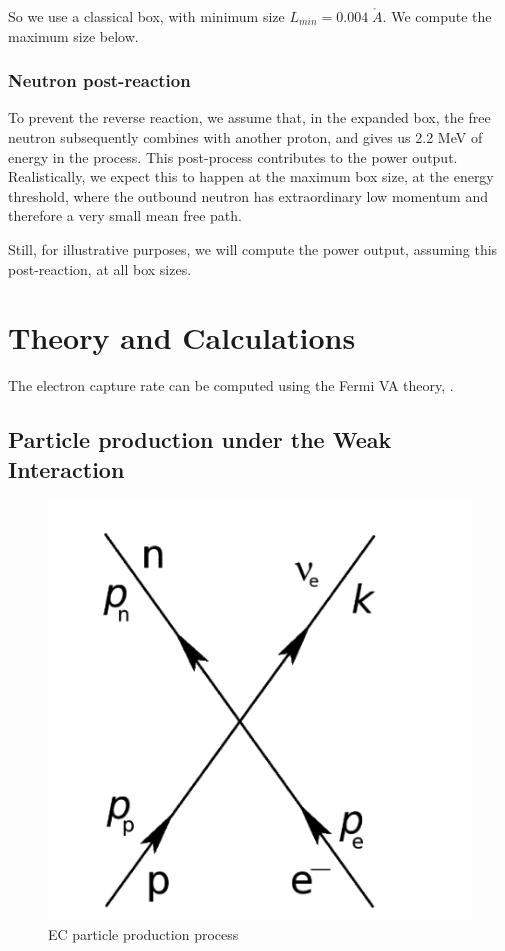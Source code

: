 \documentclass[%
 aip,
 jmp,%
 amsmath,amssymb,
 reprint,%
]{revtex4-1}
\begin{document}
So we use a classical box, with minimum size $L_{min}=0.004\;\mathring{A}$.  We compute the maximum size below.

\subsubsection{Neutron post-reaction}

To prevent the reverse reaction, we assume that, in the expanded box, the free neutron subsequently combines with another proton, and gives us 2.2 MeV of energy in the process.  This post-process contributes to the power output.  Realistically, we expect this to happen at the maximum box size, at the energy threshold, where the outbound neutron has extraordinary low momentum and therefore a very small mean free path.  

Still, for illustrative purposes, we will compute the power output,  assuming this post-reaction,  at all box sizes.

\section{Theory and Calculations}

The electron capture rate can be computed using the Fermi VA theory, \cite{ec-review1,ec-review2}.

\subsection{Particle production under the Weak Interaction}

\begin{figure}
   \includegraphics[scale=0.25]{img/feynman.png}
   \caption{EC particle production process}
  \label{fig:ppp}
\end{figure}
\end{document}
